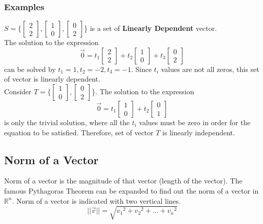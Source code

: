 \documentclass[12pt]{article}
\newcommand{\R}{\mathbb{R}}
\begin{document}
\subsubsection{Examples}
$S = \{\begin{bmatrix}2\\2\end{bmatrix}, \begin{bmatrix}1\\0\end{bmatrix}, \begin{bmatrix}0\\2\end{bmatrix} $\} is a set of \textbf{Linearly Dependent} vector.\\
The solution to the expression 
\begin{equation}
\vec{0} = t_1\begin{bmatrix}2\\2\end{bmatrix}+ t_2\begin{bmatrix}1\\0\end{bmatrix} +t_3\begin{bmatrix}0\\2\end{bmatrix}
\end{equation}
can be solved by $t_1 = 1, t_2=-2, t_3=-1$. Since $t_i$ values are not all zeros, this set of vector is linearly dependent.\\
\noindent
Consider $T = \{\begin{bmatrix}1\\0\end{bmatrix}, \begin{bmatrix}0\\2\end{bmatrix}$\}.
The solution to the expression 
\begin{equation}
\vec{0} = t_1\begin{bmatrix}1\\0\end{bmatrix}+ t_2\begin{bmatrix}0\\1\end{bmatrix}
\end{equation}
is only the trivial solution, where all the $t_i$ values must be zero in order for the equation to be satisfied. Therefore, set of vector $T$ is linearly independent.

\subsection{Norm of a Vector}
Norm of a vector is the magnitude of that vector (length of the vector). The famous Pythagoras Theorem can be expanded to find out the norm of a vector in $\R^n$.
Norm of a vector is indicated with two vertical lines.
\begin{equation}
||\vec{v}|| = \sqrt{{v_1}^2+{v_2}^2+...+{v_n}^2}
\end{equation}
\end{document}
